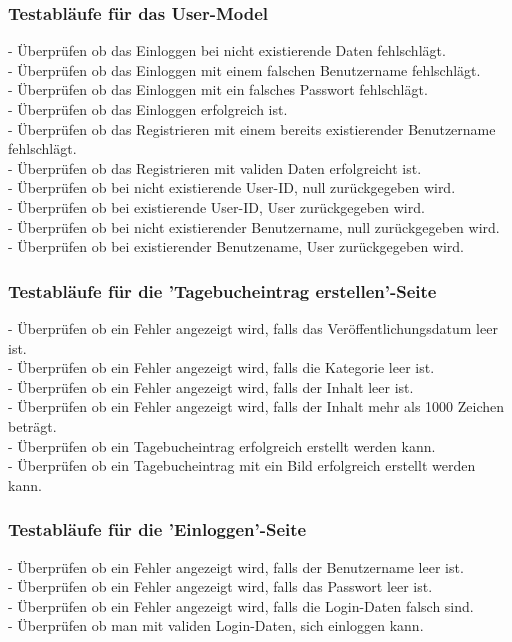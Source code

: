 \subsubsection*{Testabläufe für das User-Model}
- Überprüfen ob das Einloggen bei nicht existierende Daten fehlschlägt.\\
- Überprüfen ob das Einloggen mit einem falschen Benutzername fehlschlägt.\\
- Überprüfen ob das Einloggen mit ein falsches Passwort fehlschlägt.\\
- Überprüfen ob das Einloggen erfolgreich ist.\\
- Überprüfen ob das Registrieren mit einem bereits existierender Benutzername fehlschlägt.\\
- Überprüfen ob das Registrieren mit validen Daten erfolgreicht ist.\\
- Überprüfen ob bei nicht existierende User-ID, null zurückgegeben wird.\\
- Überprüfen ob bei existierende User-ID, User zurückgegeben wird.\\
- Überprüfen ob bei nicht existierender Benutzername, null zurückgegeben wird.\\
- Überprüfen ob bei existierender Benutzename, User zurückgegeben wird.

\subsubsection*{Testabläufe für die 'Tagebucheintrag erstellen'-Seite}
- Überprüfen ob ein Fehler angezeigt wird, falls das Veröffentlichungsdatum leer ist.\\
- Überprüfen ob ein Fehler angezeigt wird, falls die Kategorie leer ist.\\
- Überprüfen ob ein Fehler angezeigt wird, falls der Inhalt leer ist.\\
- Überprüfen ob ein Fehler angezeigt wird, falls der Inhalt mehr als 1000 Zeichen beträgt.\\
- Überprüfen ob ein Tagebucheintrag erfolgreich erstellt werden kann.\\
- Überprüfen ob ein Tagebucheintrag mit ein Bild erfolgreich erstellt werden kann.

\subsubsection*{Testabläufe für die 'Einloggen'-Seite}
- Überprüfen ob ein Fehler angezeigt wird, falls der Benutzername leer ist.\\
- Überprüfen ob ein Fehler angezeigt wird, falls das Passwort leer ist.\\
- Überprüfen ob ein Fehler angezeigt wird, falls die Login-Daten falsch sind.\\
- Überprüfen ob man mit validen Login-Daten, sich einloggen kann.

